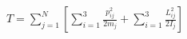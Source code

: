 \documentclass[preview]{standalone}
\begin{document}
\begin{align*}
T = \sum_{j=1}^N \left[ \sum_{i=1}^3\frac{p_{ij}^2}{2m_j} + \sum_{i=1}^3\frac{L_{ij}^2}{2I_j} \right]
\end{align*}
\end{document}
